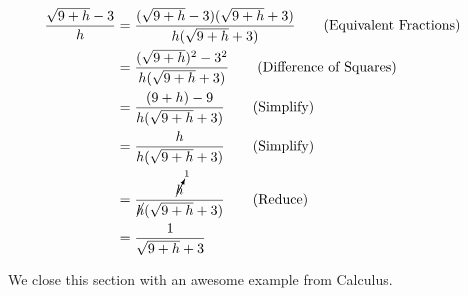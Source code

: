 \begin{ex}
\begin{enumerate}
\begin{align*}
\dfrac{\sqrt{9 + h} - 3}{h} & = \dfrac{(\sqrt{9 + h} - 3)(\sqrt{9 + h} + 3)}{h(\sqrt{9 + h} + 3)} \tag{Equivalent Fractions} \\
& = \dfrac{(\sqrt{9+h})^2 - 3^2}{h(\sqrt{9 + h} + 3)} \tag{Difference of Squares} \\
& = \dfrac{(9+h) - 9}{h(\sqrt{9 + h} + 3)} \tag{Simplify} \\
& = \dfrac{h}{h(\sqrt{9 + h} + 3)} \tag{Simplify} \\
& = \dfrac{\cancelto{1}{h}}{\cancel{h}(\sqrt{9 + h} + 3)} \tag{Reduce}\\
& = \dfrac{1}{\sqrt{9 + h} + 3} & \\
\end{align*}

\end{enumerate}

\end{ex}

We close this section with an awesome example from Calculus.%


